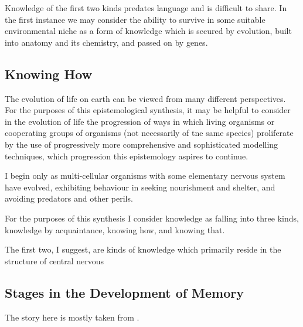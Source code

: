 \documentclass[10pt,titlepage]{book}
\begin{document}
Knowledge of the first two kinds predates language and is difficult to share.
In the first instance we may consider the ability to survive in some suitable environmental niche as a form of knowledge which is secured by evolution, built into anatomy and its chemistry, and passed on by genes.

\subsection{Knowing How}

The evolution of life on earth can be viewed from many different perspectives.
For the purposes of this epistemological synthesis, it may be helpful to consider in the evolution of life the progression of ways in which living organisms or cooperating groups of organisms (not necessarily of tne same species) proliferate by the use of progressively more comprehensive and sophisticated modelling techniques, which progression this epistemology aspires to continue.

I begin only as multi-cellular organisms with some elementary nervous system have evolved, exhibiting behaviour in seeking nourishment and shelter, and avoiding predators and other perils.

For the purposes of this synthesis I consider knowledge as falling into three kinds, knowledge by acquaintance, knowing how, and knowing that.

The first two, I suggest, are kinds of knowledge which primarily reside in the structure of central nervous

\subsection{Stages in the Development of Memory}

The story here is mostly taken from \cite{murray2017evolution}.
\end{document}

